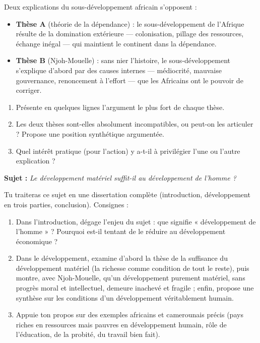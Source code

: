 \documentclass[11pt]{article}
\newcounter{popsec}
\newcounter{popsub}
\newcommand{\courssub}[1]{%
  \stepcounter{popsub}%
  \par\vspace{9pt}\noindent{\popxbold\fontsize{11.5}{13}\selectfont\color{popink}{\color{poporange}\thepopsec.\thepopsub}\hspace{6pt}#1}\par\nopagebreak\vspace{4pt}
}
\begin{document}
\begin{exercice}
Deux explications du sous-développement africain s'opposent :

\begin{itemize}
\item \textbf{Thèse A} (théorie de la dépendance) : le sous-développement de l'Afrique résulte de la domination extérieure — colonisation, pillage des ressources, échange inégal — qui maintient le continent dans la dépendance.
\item \textbf{Thèse B} (Njoh-Mouelle) : sans nier l'histoire, le sous-développement s'explique d'abord par des causes internes — médiocrité, mauvaise gouvernance, renoncement à l'effort — que les Africains ont le pouvoir de corriger.
\end{itemize}

\begin{enumerate}
\item Présente en quelques lignes l'argument le plus fort de chaque thèse.
\item Les deux thèses sont-elles absolument incompatibles, ou peut-on les articuler ? Propose une position synthétique argumentée.
\item Quel intérêt pratique (pour l'action) y a-t-il à privilégier l'une ou l'autre explication ?
\end{enumerate}
\end{exercice}

\courssub{Je me prépare au Bac}

\begin{exercice}
\textbf{Sujet :} \emph{Le développement matériel suffit-il au développement de l'homme ?}

Tu traiteras ce sujet en une dissertation complète (introduction, développement en trois parties, conclusion). Consignes :

\begin{enumerate}
\item Dans l'introduction, dégage l'enjeu du sujet : que signifie « développement de l'homme » ? Pourquoi est-il tentant de le réduire au développement économique ?
\item Dans le développement, examine d'abord la thèse de la suffisance du développement matériel (la richesse comme condition de tout le reste), puis montre, avec Njoh-Mouelle, qu'un développement purement matériel, sans progrès moral et intellectuel, demeure inachevé et fragile ; enfin, propose une synthèse sur les conditions d'un développement véritablement humain.
\item Appuie ton propos sur des exemples africains et camerounais précis (pays riches en ressources mais pauvres en développement humain, rôle de l'éducation, de la probité, du travail bien fait).
\end{enumerate}
\end{exercice}
\end{document}
